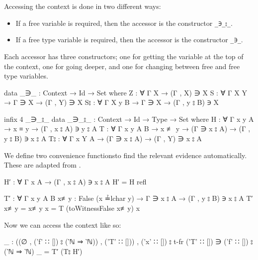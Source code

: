 \documentclass[logo,bsc,singlespacing,parskip,online]{infthesis}
\begin{document}
Accessing the context is done in two different ways:
\begin{itemize}
  \item If a free variable is required, then the accessor is the constructor \texttt{\_∋\_⦂\_}.
  \item If a free type variable is required, then the accessor is the constructor \texttt{\_∋\_}.
\end{itemize}

Each accessor has three constructors; one for getting the variable at the top of the context, one
for going deeper, and one for changing between free and free type variables.
\begin{code}
  data _∋_ : Context → Id → Set where
    Z : ∀ {Γ X} → (Γ , X) ∋ X
    S : ∀ {Γ X Y} → Γ ∋ X → (Γ , Y) ∋ X
    S⦂ : ∀ {Γ X y B} → Γ ∋ X → (Γ , y ⦂ B) ∋ X

  infix 4 _∋_⦂_
  data _∋_⦂_ : Context → Id → Type → Set where
    H : ∀ {Γ x y A} → x ≡ y → (Γ , x ⦂ A) ∋ y ⦂ A
    T : ∀ {Γ x y A B}
      → x ≢ y → (Γ ∋ x ⦂ A) → (Γ , y ⦂ B) ∋ x ⦂ A
    T⦂ : ∀ {Γ x Y A} → (Γ ∋ x ⦂ A) → (Γ , Y) ∋ x ⦂ A
\end{code}

We define two convenience functionsto find the relevant evidence automatically. These are adapted
from \citet[chapter~Lambda]{wadler_programming_2022}.
\begin{code}
  H′ : ∀ {Γ x A} → (Γ , x ⦂ A) ∋ x ⦂ A
  H′ = H refl

  T′ : ∀ {Γ x y A B} {x≢y : False (x ≟lchar y)}
    → Γ ∋ x ⦂ A → (Γ , y ⦂ B) ∋ x ⦂ A
  T′ { x≢y = x≢y } x = T (toWitnessFalse x≢y) x
\end{code}

Now we can access the context like so:
\begin{code}
  _ : ((∅ , ('f' ∷ []) ⦂ (‵ℕ ⇒ ‵ℕ)) , ('T' ∷ [])) , ('x' ∷ []) ⦂ t-fr ('T' ∷ [])
      ∋ ('f' ∷ []) ⦂ (‵ℕ ⇒ ‵ℕ)
  _ = T′ (T⦂ H′)
\end{code}
\end{document}
